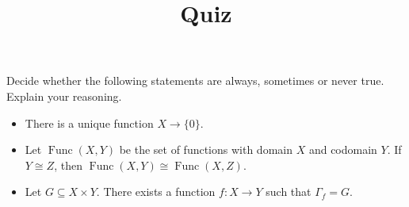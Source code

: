 \documentclass[12pt]{amsart}
\theoremstyle{definition}
\begin{document}
\title{Quiz}

\maketitle

Decide whether the following statements are always, sometimes or never true. 
Explain your reasoning. 

\begin{itemize}

\item There is a unique function $X \to \lbrace 0 \rbrace$. 

\item Let $\operatorname{Func}(X,Y)$ be the set of functions with domain $X$ 
	and codomain $Y$. If $Y \cong Z$, then $\operatorname{Func}(X,Y) 
	\cong \operatorname{Func}(X,Z)$. 

\item Let $G \subseteq X \times Y$. There exists a function $f: X \to Y$ such 
	that $\Gamma_f = G$. 

\end{itemize}
\end{document}
